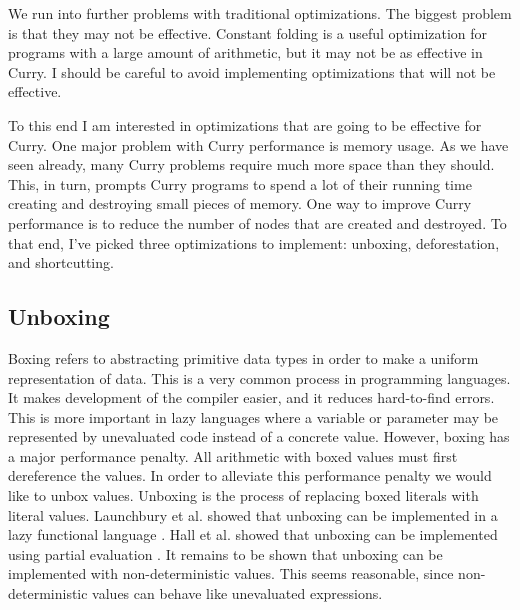 We run into further problems with traditional optimizations.
The biggest problem is that they may not be effective.
Constant folding is a useful optimization for programs with a large amount of arithmetic,
but it may not be as effective in Curry.
I should be careful to avoid implementing optimizations that will not be effective.

To this end I am interested in optimizations that are going to be effective for Curry.
One major problem with Curry performance is memory usage.
As we have seen already, many Curry problems require much more space than they should.
This, in turn, prompts Curry programs to spend a lot of their running time creating and destroying
small pieces of memory.
One way to improve Curry performance is to reduce the number of nodes that are created and destroyed.
To that end, I've picked three optimizations to implement: unboxing, deforestation, and shortcutting.

\subsection{Unboxing}

Boxing refers to abstracting primitive data types in order to make a uniform representation of data.
This is a very common process in programming languages.  It makes development of the compiler easier,
and it reduces hard-to-find errors.
This is more important in lazy languages where a variable or parameter may be represented by unevaluated code
instead of a concrete value.
However, boxing has a major performance penalty.
All arithmetic with boxed values must first dereference the values.
In order to alleviate this performance penalty we would like to unbox values.
Unboxing is the process of replacing boxed literals with literal values.
Launchbury et al. showed that unboxing can be implemented in a lazy functional language \cite{unboxing}.
Hall et al. showed that unboxing can be implemented using partial evaluation \cite{unboxing_peval}.
It remains to be shown that unboxing can be implemented with non-deterministic values.
This seems reasonable, since non-deterministic values can behave like unevaluated expressions.

